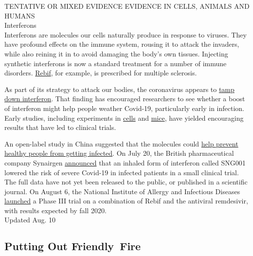 TENTATIVE OR MIXED EVIDENCE EVIDENCE IN CELLS, ANIMALS AND HUMANS\\
Interferons\\
Interferons are molecules our cells naturally produce in response to
viruses. They have profound effects on the immune system, rousing it to
attack the invaders, while also reining it in to avoid damaging the
body's own tissues. Injecting synthetic interferons is now a standard
treatment for a number of immune disorders.
\href{https://www.nationalmssociety.org/Treating-MS/Medications/Rebif}{Rebif},
for example, is prescribed for multiple sclerosis.

As part of its strategy to attack our bodies, the coronavirus appears to
\href{https://www.nytimes3xbfgragh.onion/2020/08/04/health/coronavirus-immune-system.html}{tamp
down interferon}. That finding has encouraged researchers to see whether
a boost of interferon might help people weather Covid-19, particularly
early in infection. Early studies, including experiments in
\href{https://academic.oup.com/jid/article/doi/10.1093/infdis/jiaa350/5860074}{cells}
and \href{https://pubmed.ncbi.nlm.nih.gov/32511406/}{mice}, have yielded
encouraging results that have led to clinical trials.

An open-label study in China suggested that the molecules could
\href{https://www.medrxiv.org/content/10.1101/2020.04.11.20061473v2}{help
prevent healthy people from getting infected}. On July 20, the British
pharmaceutical company Synairgen
\href{https://www.nytimes3xbfgragh.onion/2020/07/20/world/covid-19-treatment-synairgen-interferon-beta.html}{announced}
that an inhaled form of interferon called SNG001 lowered the risk of
severe Covid-19 in infected patients in a small clinical trial. The full
data have not yet been released to the public, or published in a
scientific journal. On August 6, the National Institute of Allergy and
Infectious Diseases
\href{https://www.nih.gov/news-events/news-releases/nih-clinical-trial-testing-remdesivir-plus-interferon-beta-1a-covid-19-treatment-begins}{launched}
a Phase III trial on a combination of Rebif and the antiviral
remdesivir, with results expected by fall 2020.\\
Updated Aug. 10

\hypertarget{putting-out-friendly-fire}{%
\subsection{Putting Out Friendly~Fire}\label{putting-out-friendly-fire}}

